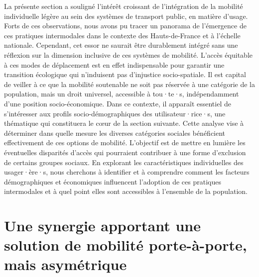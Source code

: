 \begin{refsegment}
La présente section a souligné l'intérêt croissant de l'intégration de la mobilité individuelle légère au sein des systèmes de transport public, en matière d'usage. Forts de ces observations, nous avons pu tracer un panorama de l'émergence de ces pratiques intermodales dans le contexte des Hauts-de-France et à l'échelle nationale. Cependant, cet essor ne saurait être durablement intégré sans une réflexion sur la dimension inclusive de ces systèmes de mobilité. L'accès équitable à ces modes de déplacement est en effet indispensable pour garantir une transition écologique qui n'induisent pas d'injustice socio-spatiale. Il est capital de veiller à ce que la mobilité soutenable ne soit pas réservée à une catégorie de la population, mais un droit universel, accessible à tou·te·s, indépendamment d’une position socio-économique. Dans ce contexte, il apparaît essentiel de s'intéresser aux profils socio-démographiques des utilisateur·rice·s, une thématique qui constituera le cœur de la section suivante. Cette analyse vise à déterminer dans quelle mesure les diverses catégories sociales bénéficient effectivement de ces options de mobilité. L'objectif est de mettre en lumière les éventuelles disparités d'accès qui pourraient contribuer à une forme d'exclusion de certains groupes sociaux. En explorant les caractéristiques individuelles des usager·ère·s, nous cherchons à identifier et à comprendre comment les facteurs démographiques et économiques influencent l'adoption de ces pratiques intermodales et à quel point elles sont accessibles à l'ensemble de la population.%

    \newpage
\section{Une synergie apportant une solution de mobilité porte-à-porte, mais asymétrique
    \label{section-chap4:profil-sociodemographique}
    }


\end{refsegment}
